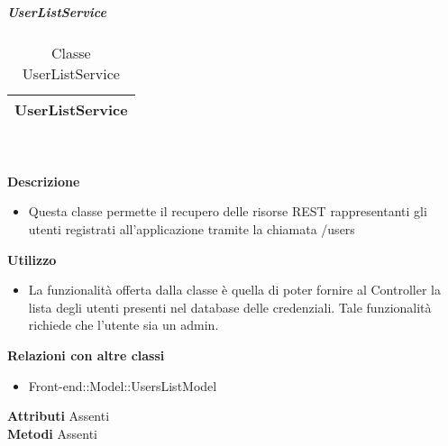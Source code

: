 			\subparagraph{UserListService} 
\begin{table}[ht]
\begin{center}
\bgroup
	\setlength{\arrayrulewidth}{0.6mm}
	\def\arraystretch{1}
		\begin{tabular}{ | p{12cm} | }
				\hline  
					\centerline{\textbf{UserListService}}
		\\ \hline 
				\hline
				\hline
		
		\end{tabular}
\egroup
\caption{Classe UserListService}
\end{center}
\end{table} \textbf{\\ \\ Descrizione}
\begin{itemize}
\item[] Questa classe permette il recupero delle risorse REST rappresentanti gli utenti registrati all'applicazione tramite la chiamata /users
\end{itemize} 
\textbf{Utilizzo}
\begin{itemize}
\item[] La funzionalità offerta dalla classe è quella di poter fornire al Controller la lista degli utenti presenti nel database delle credenziali.
Tale funzionalità richiede che l'utente sia un admin.
\end{itemize}
\textbf{Relazioni con altre classi}
\begin{itemize}
\item{Front-end::Model::UsersListModel}
\end{itemize}
\textbf{Attributi}
Assenti \\
\textbf{Metodi}
Assenti \\

